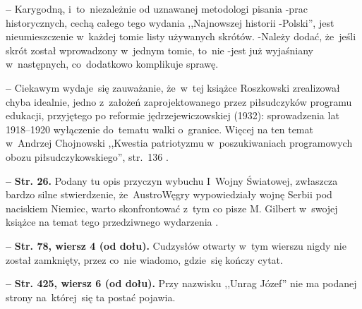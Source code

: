 \documentclass[a4paper,11pt]{article}
\newcommand{\spaceFour}{0.5em}
\newcommand{\tb}{\textbf}
\newcommand{\noi}{\noindent}
\newcommand{\start}{\noi \tb{--} {}}
\newcommand{\Str}[1]{\tb{Str. #1.}}
\newcommand{\StrWd}[2]{\tb{Str. #1, wiersz #2 (od dołu).}}
\begin{document}
\start Karygodną, i~to~niezależnie od uznawanej metodologi pisania
-prac historycznych, cechą całego tego wydania ,,Najnowszej historii
-Polski'', jest nieumieszczenie w~każdej tomie listy używanych
skrótów. -Należy dodać, że~jeśli skrót został wprowadzony w~jednym
tomie, to~nie -jest już wyjaśniany w~następnych, co~dodatkowo
komplikuje sprawę.

\vspace{\spaceFour}


\start Ciekawym wydaje~się zauważanie, że~w~tej książce Roszkowski
zrealizował chyba idealnie, jedno z~założeń zaprojektowanego przez
piłsudczyków programu edukacji, przyjętego po reformie
jędrzejewiczowskiej (1932): sprowadzenia lat 1918--1920 wyłączenie
do~tematu walki o~granice. Więcej na ten temat \\
w~Andrzej Chojnowski ,,Kwestia patriotyzmu w~poszukiwaniach
programowych obozu piłsudczykowskiego'', str.~136
\cite{PatriotyzmPolakow06}.

\vspace{\spaceFour}


\start \Str{26} Podany tu opis przyczyn wybuchu I~Wojny Światowej,
zwłaszcza bardzo silne stwierdzenie, że~Austro\dywiz Węgry
wypowiedziały wojnę Serbii pod naciskiem Niemiec, warto skonfrontować
z~tym co pisze M. Gilbert w~swojej książce na temat tego przedziwnego
wydarzenia \cite{Gilbert03}.

\vspace{\spaceFour}


\start \StrWd{78}{4} Cudzysłów otwarty w~tym wierszu nigdy nie został
zamknięty, przez co~nie wiadomo, gdzie~się kończy cytat.

\start \StrWd{425}{6} Przy nazwisku ,,Unrag Józef'' nie ma podanej
strony na~której~się ta postać pojawia.
\end{document}
